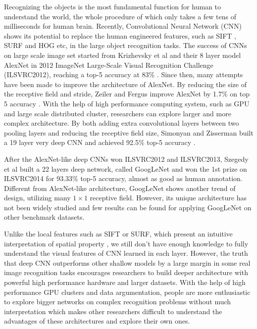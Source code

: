 ﻿Recognizing the objects is the most fundamental function for human to understand the world, the whole procedure of which only takes a few tens of milliseconds for human brain.
Recently, Convolutional Neural Network (CNN) shows its potential to replace the human engineered features, such as SIFT \cite{lowe1999object}, SURF \cite{bay2006surf} and HOG \cite{dalal2005histograms} etc, in the large object recognition tasks. The success of CNNs on large scale image set started from Krizhevsky et al and their 8 layer model AlexNet in 2012 ImageNet Large-Scale Visual Recognition Challenge (ILSVRC2012), reaching a top-5 accuracy at 83\% \cite{krizhevsky2012imagenet}. Since then, many attempts have been made to improve the architecture of AlexNet.
By reducing the size of the receptive field and stride, Zeiler and Fergus improve AlexNet by 1.7\% on top 5 accuracy \cite{zeiler2014visualizing}. With the help of high performance computing system, such as GPU and large scale distributed cluster, researchers can explore larger and more complex architecture. By both adding extra convolutional layers between two pooling layers and reducing the receptive field size, Simonyan and Zisserman built a 19 layer very deep CNN and achieved 92.5\% top-5 accuracy \cite{simonyan2014very}.

After the AlexNet-like deep CNNs won ILSVRC2012 and ILSVRC2013, Szegedy et al built a 22 layers deep network, called GoogLeNet and won the 1st prize on ILSVRC2014 for 93.33\% top-5 accuracy, almost as good as human annotation\cite{szegedy2014going}. Different from AlexNet-like architecture, GoogLeNet shows another trend of design, utilizing many $1\times 1$ receptive field. However, its unique architecture has not been widely studied and few results can be found for applying GoogLeNet on other benchmark datasets.

Unlike the local features such as SIFT or SURF, which present an intuitive interpretation of spatial property%
, we still don't have enough knowledge to fully understand the visual features of CNN learned in each layer.
However, the truth that deep CNN outperforms other shallow models by a large margin in some real image recognition tasks encourages researchers to build deeper architecture with powerful high performance hardware and larger datasets. With the help of high performance GPU clusters and data argumentation, people are more enthusiastic to explore bigger networks on complex recognition problems without much interpretation which makes other researchers difficult to understand the advantages of these architectures and explore their own ones.

